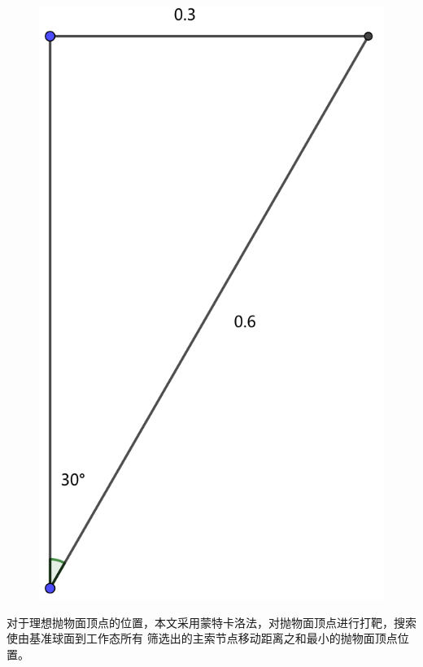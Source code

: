 \documentclass[withoutpreface,bwprint]{cumcmthesis} %
\begin{document}
\begin{figure}[!h]
\begin{minipage}[c]{0.48\textwidth}
    \end{minipage}
    \begin{minipage}[c]{0.48\textwidth}
        \centering
        \includegraphics[height=0.2\textheight]{angle2.pdf}
    \end{minipage}
    \caption{}
    \label{fig:range}
\end{figure}

对于理想抛物面顶点的位置，本文采用蒙特卡洛法，对抛物面顶点进行打靶，搜索使由基准球面到工作态所有
筛选出的主索节点移动距离之和最小的抛物面顶点位置。
\end{document}
